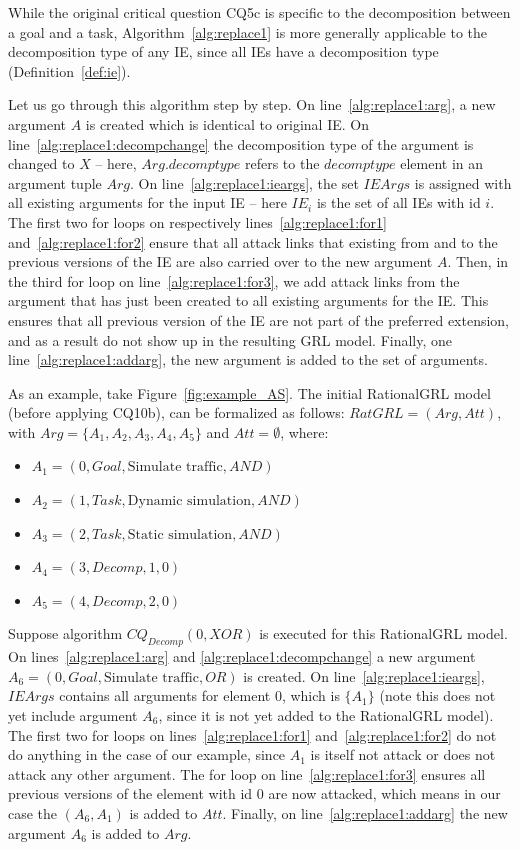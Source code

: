 While the original critical question CQ5c is specific to the decomposition between a goal and a task, Algorithm~\ref{alg:replace1} is more generally applicable to the decomposition type of any IE, since all IEs have a decomposition type (Definition~\ref{def:ie}). 

Let us go through this algorithm step by step. On line~\ref{alg:replace1:arg}, a new argument $A$ is created which is identical to original IE. On line~\ref{alg:replace1:decompchange} the decomposition type of the argument is changed to $X$ -- here, $Arg.decomptype$ refers to the $decomptype$ element in an argument tuple $Arg$. On line~\ref{alg:replace1:ieargs}, the set $IEArgs$ is assigned with all existing arguments for the input IE -- here $IE_i$ is the set of all IEs with id $i$. The first two for loops on respectively lines~\ref{alg:replace1:for1} and~\ref{alg:replace1:for2} ensure that all attack links that existing from and to the previous versions of the IE are also carried over to the new argument $A$. Then, in the third for loop on line~\ref{alg:replace1:for3}, we add attack links from the argument that has just been created to all existing arguments for the IE. This ensures that all previous version of the IE are not part of the preferred extension, and as a result do not show up in the resulting GRL model. Finally, one line~\ref{alg:replace1:addarg}, the new argument is added to the set of arguments.

As an example, take Figure~\ref{fig:example_AS}. The initial RationalGRL model (before applying CQ10b), can be formalized as follows: $RatGRL=(Arg,Att)$, with $Arg=\{A_1,A_2,A_3,A_4,A_5\}$ and $Att=\emptyset$, where:
\begin{itemize}
\item $A_1=(0,Goal,\text{Simulate traffic},AND)$
\item $A_2=(1,Task,\text{Dynamic simulation},AND)$
\item $A_3=(2,Task,\text{Static simulation},AND)$
\item $A_4=(3,Decomp,1,0)$
\item $A_5=(4,Decomp,2,0)$
\end{itemize}

Suppose algorithm $CQ_{Decomp}(0, XOR)$ is executed for this RationalGRL model. On lines~\ref{alg:replace1:arg} and \ref{alg:replace1:decompchange} a new argument $A_6=(0,Goal,\text{Simulate traffic},OR)$ is created. On line~\ref{alg:replace1:ieargs}, $IEArgs$ contains all arguments for element 0, which is $\{A_1\}$ (note this does not yet include argument $A_6$, since it is not yet added to the RationalGRL model). The first two for loops on lines~\ref{alg:replace1:for1} and~\ref{alg:replace1:for2} do not do anything in the case of our example, since $A_1$ is itself not attack or does not attack any other argument. The for loop on line~\ref{alg:replace1:for3} ensures all previous versions of the element with id 0 are now attacked, which means in our case the $(A_6,A_1)$ is added to $Att$. Finally, on line~\ref{alg:replace1:addarg} the new argument $A_6$ is added to $Arg$.

